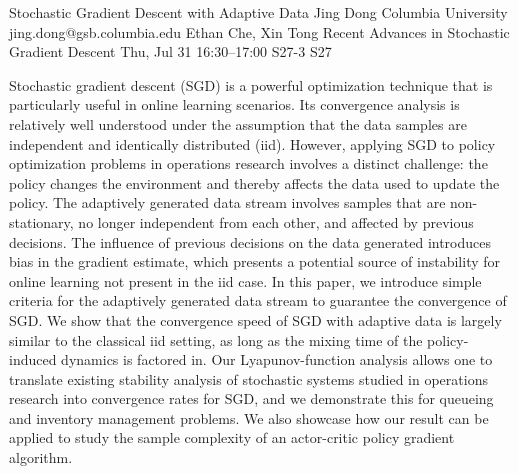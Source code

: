\begin{talk}
  {Stochastic Gradient Descent with Adaptive Data}%
  {Jing Dong}%
  {Columbia University}%
  {jing.dong@gsb.columbia.edu}%
  {Ethan Che, Xin Tong}%
  {Recent Advances in Stochastic Gradient Descent}%
  {Thu, Jul 31 16:30–17:00}%
  {S27-3}%
  {S27}%
				
                
Stochastic gradient descent (SGD) is a powerful optimization technique that is particularly useful in online learning scenarios. Its convergence analysis is relatively well understood under the assumption that the data samples are independent and identically distributed (iid). However, applying SGD to policy optimization
problems in operations research involves a distinct challenge: the policy changes the environment and thereby affects the data used to update the policy. The adaptively generated data stream involves samples that are non-stationary, no longer independent from each other, and affected by previous decisions. The influence of previous decisions on the data generated introduces bias in the gradient estimate, which presents a potential source of instability for online learning not present in the iid case. In this paper, we introduce simple criteria for the adaptively generated data stream to guarantee the convergence of SGD. We show that the convergence
speed of SGD with adaptive data is largely similar to the classical iid setting, as long as the mixing time of the policy-induced dynamics is factored in. Our Lyapunov-function analysis allows one to translate existing stability analysis of stochastic systems studied in operations research into convergence rates for SGD, and
we demonstrate this for queueing and inventory management problems. We also showcase how our result can be applied to study the sample complexity of an actor-critic policy gradient algorithm.			


\medskip


\end{talk}

